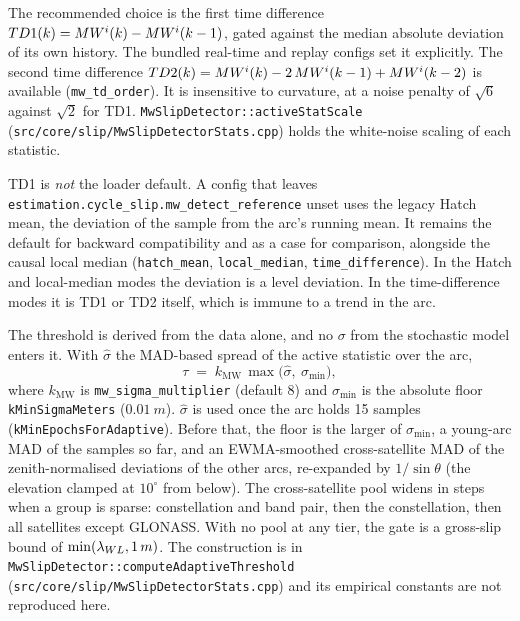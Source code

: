 \documentclass[main.tex]{subfiles}
\begin{document}
The recommended choice is the first time difference
$TD1(k) = MW^i(k) - MW^i(k-1)$, gated against the
median absolute deviation of its own history.  The bundled real-time and
replay configs set it explicitly.  The second time difference
$TD2(k) = MW^i(k) - 2\,MW^i(k-1) + MW^i(k-2)$ is
available (\texttt{mw\_td\_order}).  It is insensitive to curvature, at a
noise penalty of $\sqrt{6}$ against $\sqrt{2}$ for TD1.
\texttt{MwSlipDetector::activeStatScale}
(\texttt{src/core/slip/MwSlipDetectorStats.cpp}) holds the white-noise
scaling of each statistic.

TD1 is \emph{not} the loader default.  A config that leaves
\texttt{estimation.cycle\_slip.mw\_detect\_reference} unset uses the
legacy Hatch mean, the deviation of the sample from the arc's running
mean.  It remains the default for backward compatibility and as a case
for comparison, alongside the causal local median
(\texttt{hatch\_mean}, \texttt{local\_median}, \texttt{time\_difference}).
In the Hatch and local-median modes the deviation is a level deviation.
In the time-difference modes it is TD1 or TD2 itself, which is immune to a
trend in the arc.

The threshold is derived from the data alone, and no $\sigma$ from the
stochastic model enters it.  With $\hat\sigma$ the MAD-based spread of the
active statistic over the arc,
\begin{equation}
\tau \;=\; k_{\mathrm{MW}}\,\max\!\bigl(\hat\sigma,\ \sigma_{\min}\bigr),
\label{eq:mw-gate}
\end{equation}
where $k_{\mathrm{MW}}$ is \texttt{mw\_sigma\_multiplier} (default 8) and
$\sigma_{\min}$ is the absolute floor \texttt{kMinSigmaMeters} ($\SI{0.01}{m}$).
$\hat\sigma$ is used once the arc holds 15 samples
(\texttt{kMinEpochsForAdaptive}).  Before that, the floor is the larger of
$\sigma_{\min}$, a young-arc MAD of the samples so far, and an
EWMA-smoothed cross-satellite MAD of the zenith-normalised deviations of the
other arcs, re-expanded by $1/\sin\theta$ (the elevation clamped at
$10^\circ$ from below).  The cross-satellite pool widens in steps when a
group is sparse: constellation and band pair, then the constellation, then
all satellites except GLONASS.  With no pool at any tier, the gate is a
gross-slip bound of $\min(\lamwl, \SI{1}{m})$.  The construction is in
\texttt{MwSlipDetector::computeAdaptiveThreshold}
(\texttt{src/core/slip/MwSlipDetectorStats.cpp}) and its empirical
constants are not reproduced here.
\end{document}
